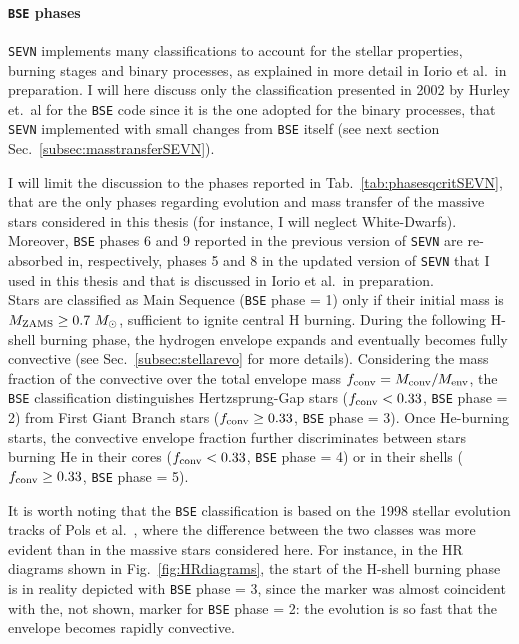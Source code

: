 \documentclass[a4paper,titlepage]{book}     	%
\newcommand{\sun}{\ensuremath{_\odot}}
\newcommand{\mzams}{M_\textup{ZAMS}}
\newcommand{\msun}{\ensuremath{M\sun}}
\begin{document}
\paragraph{\texttt{BSE} phases} \texttt{SEVN} implements many classifications to account for the stellar properties, burning stages and binary processes, as explained in more detail in Iorio et al.\ in preparation. I will here discuss only the classification presented in 2002 by Hurley et.\ al \cite{Hurley2002} for the \texttt{BSE} code since it is the one adopted for the binary processes, that \texttt{SEVN} implemented with small changes from \texttt{BSE} itself (see next section Sec.\ \ref{subsec:masstransferSEVN}). 

I will limit the discussion to the phases reported in Tab.\ \ref{tab:phasesqcritSEVN}, that are the only phases regarding evolution and mass transfer of the massive stars considered in this thesis (for instance, I will neglect White-Dwarfs). Moreover, \texttt{BSE} phases 6 and 9 reported in the previous version of \texttt{SEVN} \cite{spera2019_mergingBBH} are re-absorbed in, respectively, phases 5 and 8 in the updated version of \texttt{SEVN} that I used in this thesis and that is discussed in Iorio et al.\ in preparation.\\ %

Stars are classified as Main Sequence (\texttt{BSE} phase = 1) only if their initial mass is $\mzams \geq 0.7~\msun$, sufficient to ignite central H burning. During the following H-shell burning phase, the hydrogen envelope expands and eventually becomes fully convective (see Sec.\ \ref{subsec:stellarevo} for more details). Considering the mass fraction of the convective over the total envelope mass $f_{\rm conv}= M_{\rm conv}/M_{\rm env}$, the \texttt{BSE} classification distinguishes Hertzsprung-Gap stars ($f_{\rm conv} < 0.33$, \texttt{BSE} phase = 2) from First Giant Branch stars ($f_{\rm conv} \geq 0.33$, \texttt{BSE} phase = 3).  Once He-burning starts, the convective envelope fraction further discriminates between stars burning He in their cores ($f_{\rm conv} < 0.33$, \texttt{BSE} phase = 4) or in their shells ($f_{\rm conv} \geq 0.33$, \texttt{BSE} phase = 5).

It is worth noting that the \texttt{BSE} classification is based on the 1998 stellar evolution tracks of Pols et al.\ \cite{Pols1998evotracks}, where the difference between the two classes was more evident than in the massive stars considered here. For instance, in the HR diagrams shown in Fig.\ \ref{fig:HRdiagrams}, the start of the H-shell burning phase is in reality depicted with \texttt{BSE} phase = 3, since the marker was almost coincident with the, not shown, marker for \texttt{BSE} phase = 2: the evolution is so fast that the envelope becomes rapidly convective. \\
\end{document}
